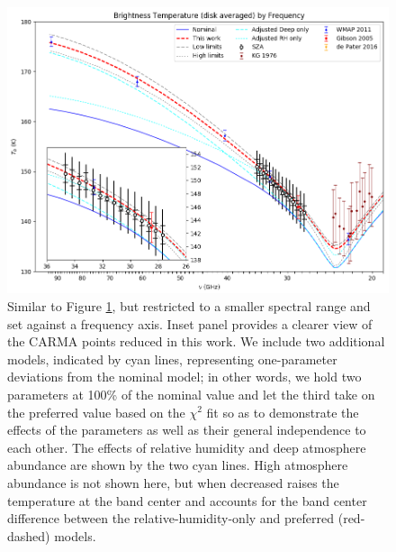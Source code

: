 \documentclass{article}
\begin{document}
	\begin{figure}
		\centering
		\includegraphics[width=\textwidth]{final_models_freq.png}
		\caption{\label{fig:emission_freq}Similar to Figure \ref{fig:emission_freq}, but restricted to a smaller spectral range and set against a frequency axis. Inset panel provides a clearer view of the CARMA points reduced in this work. We include two additional models, indicated by cyan lines, representing one-parameter deviations from the nominal model; in other words, we hold two parameters at 100\% of the nominal value and let the third take on the preferred value based on the $\chi^{2}$ fit so as to demonstrate the effects of the parameters as well as their general independence to each other. The effects of relative humidity and deep atmosphere abundance are shown by the two cyan lines. High atmosphere abundance is not shown here, but when decreased raises the temperature at the band center and accounts for the band center difference between the relative-humidity-only and preferred (red-dashed) models.}
	\end{figure}
\end{document}
